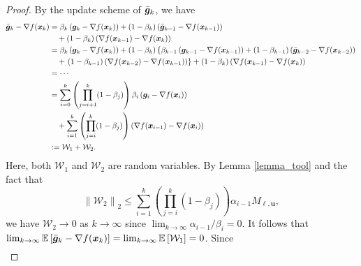 \documentclass[aos]{imsart}
\numberwithin{equation}{section}
\theoremstyle{plain}
\begin{document}
\begin{appendix}
\begin{proof}
By the update scheme of $\Bar{\bm{g}}_{k}$, we have
    \begin{equation*}
        \begin{split}
            \Bar{\bm{g}}_{k} - \nabla f(\bm{x}_k) & = \beta_k \left( \bm{g}_k - \nabla f(\bm{x}_k) \right) + (1-\beta_k) \left( \Bar{\bm{g}}_{k-1} - \nabla f(\bm{x}_{k-1}) \right) \\
            & \hspace{1em} + (1-\beta_k) \left( \nabla f(\bm{x}_{k-1}) - \nabla f(\bm{x}_k) \right)\\
            & = \beta_k \left( \bm{g}_k - \nabla f(\bm{x}_k) \right) + (1-\beta_k)  \left\{ \beta_{k-1} \left( \bm{g}_{k-1} - \nabla f(\bm{x}_{k-1}) \right)  + (1-\beta_{k-1}) \left( \Bar{\bm{g}}_{k-2} - \nabla f(\bm{x}_{k-2}) \right) \right.\\
            & \hspace{1em} + \left. (1-\beta_{k-1}) \left( \nabla f(\bm{x}_{k-2}) - \nabla f(\bm{x}_{k-1}) \right) \right\} + (1-\beta_k) \left( \nabla f(\bm{x}_{k-1}) - \nabla f(\bm{x}_k) \right) \\
            & = \cdots\\
            & = \sum_{i=0}^{k} \left( \prod_{j=i+1}^{k} (1-\beta_j) \right) \beta_i \left( \bm{g}_{i} - \nabla f(\bm{x}_{i}) \right) \\
            & \hspace{1em} + \sum_{i=1}^{k} \left( \prod_{j=i}^{k} (1-\beta_j) \right) \left( \nabla f(\bm{x}_{i-1}) - \nabla f(\bm{x}_{i}) \right) \\
            & := \mathcal{W}_1 + \mathcal{W}_2.
        \end{split}
    \end{equation*}
    Here, both $\mathcal{W}_1$ and $\mathcal{W}_2$ are random variables. By Lemma \ref{lemma_tool} and the fact that 
    \begin{equation*}
        \left\|\mathcal{W}_2\right\|_2 \leq \sum_{i=1}^{k} \left( \prod_{j=i}^{k} (1-\beta_j) \right) \alpha_{i-1} M_{\bm{\ell},\bm{u}},
    \end{equation*}
    we have $\mathcal{W}_2 \to 0$ as $k \to \infty$ since $\lim_{k \to \infty} \alpha_{i-1}/\beta_i = 0$. It follows that $\lim_{k \to \infty} \mathbb{E} \left[ \Bar{\bm{g}}_{k} - \nabla f(\bm{x}_k) \right] = \lim_{k \to \infty} \mathbb{E} \left[ \mathcal{W}_1 \right] = 0$. Since
    \begin{equation*}
        \begin{split}

\end{split}
\end{equation*}
\end{proof}
\end{appendix}
\end{document}
